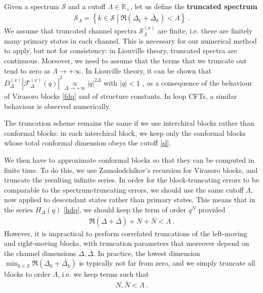 \documentclass[12pt, a4paper]{article}
\newcommand{\myindex}[1]{\textbf{\boldmath #1}}
\begin{document}
Given a spectrum $\mathcal{S}$ and a cutoff $\Lambda \in \mathbb{R}_+$, let us define the \myindex{truncated spectrum}
\begin{align}
 \mathcal{S}_\Lambda = \left\{ k\in \mathcal{S}\middle| \Re\left(\Delta_k+\bar\Delta_k\right)<\Lambda \right\} \ . 
 \label{sl}
\end{align}
We assume that truncated channel spectra $\mathcal{S}^{(x)}_\Lambda$ are finite, i.e. there are finitely many primary states in each channel. This is necessary for our numerical method to apply, but not for consistency: in Liouville theory, truncated spectra are continuous. Moreover, we need to assume that the terms that we truncate out tend to zero as $\Lambda\to +\infty$. In Liouville theory, it can be shown that $D^{(x)}_\Delta \left|\mathcal{F}^{(x)}_\Delta(q)\right|^2 \underset{\Delta\to+\infty}{\propto} |q|^{2\Delta}$ with $|q|<1$ \cite{rs15}, as a consequence of the behaviour of Virasoro blocks \eqref{fdq} and of structure constants. In loop CFTs, a similar behaviour is observed numerically.

The truncation scheme remains the same if we use interchiral blocks rather than conformal blocks: in each interchiral block, we keep only the conformal blocks whose total conformal dimension obeys the cutoff \eqref{sl}. 

We then have to approximate conformal blocks so that they can be computed in finite time. To do this, we use Zamolodchikov's recursion for Virasoro blocks, and truncate the resulting infinite series. In order for the block-truncating errors to be comparable to the spectrum-truncating errors, we should use the same cutoff $\Lambda$, now applied to descendant states rather than primary states. This means that in the series $H_\Delta(q)$ \eqref{hdq}, we should keep the term of order $q^N$ provided
\begin{align}
 \Re\left(\Delta +\bar\Delta\right) + N + \bar N <\Lambda\ . 
\end{align}
However, it is impractical to perform correlated truncations of the left-moving and right-moving blocks, with truncation parameters that moreover depend on the channel dimensions $\Delta,\bar\Delta$. In practice, the lowest dimension $\min_{k\in\mathcal{S}}\Re\left(\Delta_k+\bar\Delta_k\right)$ is typically not far from zero, and we simply truncate all blocks to order $\Lambda$, i.e. we keep terms such that 
\begin{align}
 N,\bar N < \Lambda \ . 
\end{align}
\end{document}

